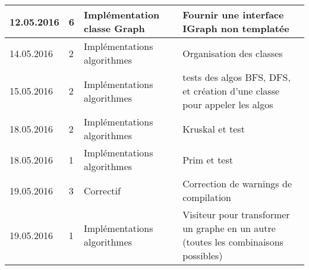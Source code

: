 \documentclass[french]{article}
\begin{document}
\begin{tabular}{p{}|p{}|p{}|p{}}
		\hline
		12.05.2016 & 6 & Implémentation classe Graph & Fournir une interface IGraph non templatée \\
		\hline
		14.05.2016 & 2 & Implémentations algorithmes & Organisation des classes \\
		\hline
		15.05.2016 & 2 & Implémentations algorithmes & tests des algos BFS, DFS, et création d'une classe pour appeler les algos \\
		\hline
		18.05.2016 & 2 & Implémentations algorithmes & Kruskal et test\\
		\hline
		18.05.2016 & 1 & Implémentations algorithmes & Prim et test\\
		\hline
		19.05.2016 & 3 & Correctif & Correction de warnings de compilation\\
		\hline
		19.05.2016 & 1 & Implémentations algorithmes & Visiteur pour transformer un graphe en un autre (toutes les combinaisons possibles)\\
	\end{tabular}
	
\end{document}
